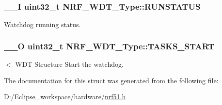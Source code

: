 \subsubsection[{R\+U\+N\+S\+T\+A\+T\+U\+S}]{\setlength{\rightskip}{0pt plus 5cm}\+\_\+\+\_\+\+I uint32\+\_\+t N\+R\+F\+\_\+\+W\+D\+T\+\_\+\+Type\+::\+R\+U\+N\+S\+T\+A\+T\+U\+S}\label{struct_n_r_f___w_d_t___type_a2a8c0b6c975fb19e151bc285e770a310}
Watchdog running status. \hypertarget{struct_n_r_f___w_d_t___type_a0eaed603e78d2e13b969b90cec26459c}{}
\subsubsection[{T\+A\+S\+K\+S\+\_\+\+S\+T\+A\+R\+T}]{\setlength{\rightskip}{0pt plus 5cm}\+\_\+\+\_\+\+O uint32\+\_\+t N\+R\+F\+\_\+\+W\+D\+T\+\_\+\+Type\+::\+T\+A\+S\+K\+S\+\_\+\+S\+T\+A\+R\+T}\label{struct_n_r_f___w_d_t___type_a0eaed603e78d2e13b969b90cec26459c}
$<$ W\+D\+T Structure Start the watchdog. 

The documentation for this struct was generated from the following file\+:\begin{DoxyCompactItemize}
\item 
D\+:/\+Eclipse\+\_\+workspace/hardware/\hyperlink{nrf51_8h}{nrf51.\+h}\end{DoxyCompactItemize}
